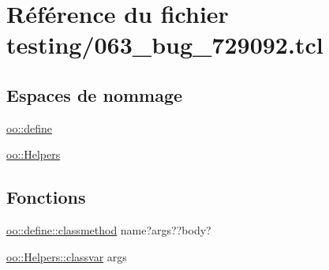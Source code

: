 \hypertarget{063__bug__729092_8tcl}{}\section{Référence du fichier testing/063\+\_\+bug\+\_\+729092.tcl}
\label{063__bug__729092_8tcl}
\subsection*{Espaces de nommage}
\begin{DoxyCompactItemize}
\item 
 \hyperlink{namespaceoo_1_1define}{oo\+::define}
\item 
 \hyperlink{namespaceoo_1_1_helpers}{oo\+::\+Helpers}
\end{DoxyCompactItemize}
\subsection*{Fonctions}
\begin{DoxyCompactItemize}
\item 
\hyperlink{namespaceoo_1_1define_a89e7ea222a316f1926c1f9f30f2cc5c1}{oo\+::define\+::classmethod} name?args??body?
\item 
\hyperlink{namespaceoo_1_1_helpers_a96c5b755588beb2e930cff23ce811d6c}{oo\+::\+Helpers\+::classvar} args
\end{DoxyCompactItemize}
